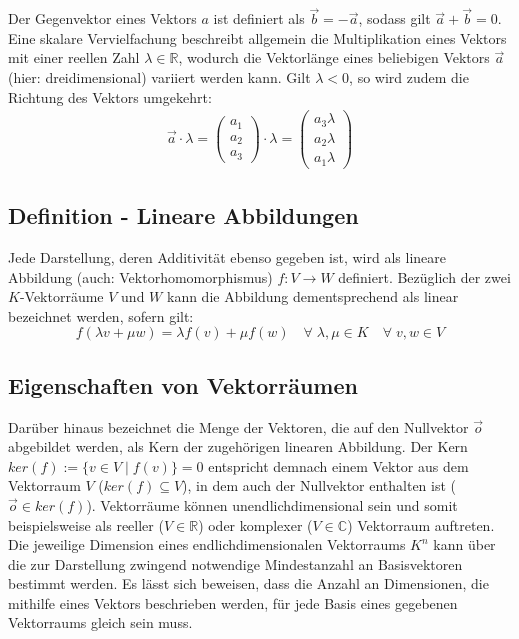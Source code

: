 \documentclass[]{dsadokumentation}
\begin{document}
Der Gegenvektor eines Vektors $a$ ist definiert als $\vec{b} = -\vec{a}$, sodass gilt $\vec{a} + \vec{b} = 0$. Eine skalare Vervielfachung beschreibt allgemein die Multiplikation eines Vektors mit einer reellen Zahl $\lambda \in \mathbb{R}$, wodurch die Vektorlänge eines beliebigen Vektors $\vec{a}$ (hier: dreidimensional) variiert werden kann. Gilt $\lambda < 0$, so wird zudem die Richtung des Vektors umgekehrt:
\begin{equation}
  \begin{aligned}
    \vec{a} \cdot \lambda = \left(\begin{array}{c} a_1 \\ a_2 \\ a_3 \end{array}\right)\cdot \lambda=\left(\begin{array}{c} a_3 \lambda \\ a_2 \lambda \\ a_1 \lambda \end{array}\right)
  \end{aligned}
\end{equation}

\subsection{Definition - Lineare Abbildungen}
Jede Darstellung, deren Additivität ebenso gegeben ist, wird als lineare Abbildung (auch: Vektorhomomorphismus) $f: V \rightarrow W$ definiert. Bezüglich der zwei $K$-Vektorräume $V$ und $W$ kann die Abbildung dementsprechend als linear bezeichnet werden, sofern gilt:
\begin{equation}
  f(\lambda v + \mu w)=\lambda f(v) + \mu f(w) \quad \forall \; \lambda, \mu \in K \quad \forall \; v, w \in V
\end{equation}

\subsection{Eigenschaften von Vektorräumen}
Darüber hinaus bezeichnet die Menge der Vektoren, die auf den Nullvektor $\vec{o}$ abgebildet werden, als Kern der zugehörigen linearen Abbildung. Der Kern $ker(f):= \{v \in V \; \big\vert \; f(v) \} = 0$ entspricht demnach einem Vektor aus dem Vektorraum $V$ ($ker(f) \subseteq V$), in dem auch der Nullvektor enthalten ist ($\vec{o} \in ker(f)$). Vektorräume können unendlichdimensional sein und somit beispielsweise als reeller ($V \in \mathbb{R}$) oder komplexer ($V \in \mathbb{C}$) Vektorraum auftreten. Die jeweilige Dimension eines endlichdimensionalen Vektorraums $K^n$ kann über die zur Darstellung zwingend notwendige Mindestanzahl an Basisvektoren bestimmt werden. Es lässt sich beweisen, dass die Anzahl an Dimensionen, die mithilfe eines Vektors beschrieben werden, für jede Basis eines gegebenen Vektorraums gleich sein muss.
\end{document}
